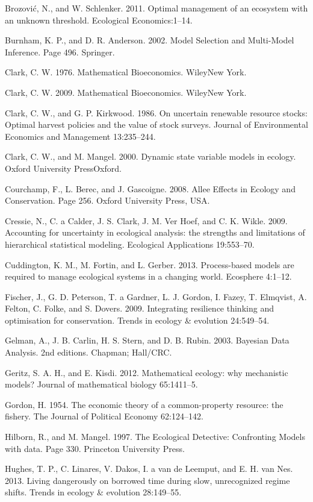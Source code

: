 \documentclass[author-year, 12pt,review]{components/elsarticle} %
\begin{document}
Brozović, N., and W. Schlenker. 2011. Optimal management of an ecosystem
with an unknown threshold. Ecological Economics:1--14.

Burnham, K. P., and D. R. Anderson. 2002. Model Selection and
Multi-Model Inference. Page 496. Springer.

Clark, C. W. 1976. Mathematical Bioeconomics. WileyNew York.

Clark, C. W. 2009. Mathematical Bioeconomics. WileyNew York.

Clark, C. W., and G. P. Kirkwood. 1986. On uncertain renewable resource
stocks: Optimal harvest policies and the value of stock surveys. Journal
of Environmental Economics and Management 13:235--244.

Clark, C. W., and M. Mangel. 2000. Dynamic state variable models in
ecology. Oxford University PressOxford.

Courchamp, F., L. Berec, and J. Gascoigne. 2008. Allee Effects in
Ecology and Conservation. Page 256. Oxford University Press, USA.

Cressie, N., C. a Calder, J. S. Clark, J. M. {Ver Hoef}, and C. K.
Wikle. 2009. Accounting for uncertainty in ecological analysis: the
strengths and limitations of hierarchical statistical modeling.
Ecological Applications 19:553--70.

Cuddington, K. M., M. Fortin, and L. Gerber. 2013. Process-based models
are required to manage ecological systems in a changing world. Ecosphere
4:1--12.

Fischer, J., G. D. Peterson, T. a Gardner, L. J. Gordon, I. Fazey, T.
Elmqvist, A. Felton, C. Folke, and S. Dovers. 2009. Integrating
resilience thinking and optimisation for conservation. Trends in ecology
\& evolution 24:549--54.

Gelman, A., J. B. Carlin, H. S. Stern, and D. B. Rubin. 2003. Bayesian
Data Analysis. 2nd editions. Chapman; Hall/CRC.

Geritz, S. A. H., and E. Kisdi. 2012. Mathematical ecology: why
mechanistic models? Journal of mathematical biology 65:1411--5.

Gordon, H. 1954. The economic theory of a common-property resource: the
fishery. The Journal of Political Economy 62:124--142.

Hilborn, R., and M. Mangel. 1997. The Ecological Detective: Confronting
Models with data. Page 330. Princeton University Press.

Hughes, T. P., C. Linares, V. Dakos, I. a van de Leemput, and E. H. van
Nes. 2013. Living dangerously on borrowed time during slow, unrecognized
regime shifts. Trends in ecology \& evolution 28:149--55.
\end{document}
